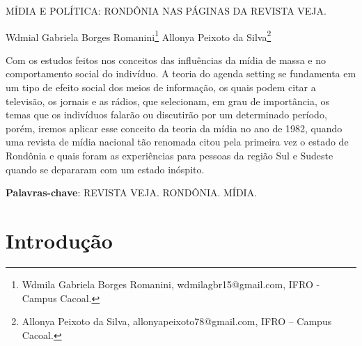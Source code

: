 \documentclass[article,12pt,onesidea,4paper,english,brazil]{abntex2}
\begin{document}
	
	
	\frenchspacing 
	
	\begin{center}
		\LARGE MÍDIA E POLÍTICA: RONDÔNIA NAS PÁGINAS DA REVISTA VEJA.
		
		\normalsize
	Wdmial Gabriela Borges Romanini\footnote{Wdmila Gabriela Borges Romanini, wdmilagbr15@gmail.com, IFRO - Campus Cacoal.} 
	Allonya Peixoto da Silva\footnote{Allonya Peixoto da Silva, allonyapeixoto78@gmail.com, IFRO – Campus Cacoal.} 
		
	\end{center}
	
	\begin{resumoumacoluna}
		Com os estudos feitos nos conceitos das influências da mídia de massa e no comportamento social do indivíduo. A teoria do agenda setting se fundamenta  em um tipo de efeito social dos meios de informação, os quais podem citar a televisão, os jornais e as rádios, que selecionam, em grau de importância, os temas que os indivíduos falarão ou discutirão por um determinado período, porém, iremos aplicar esse conceito da teoria da mídia no ano de 1982, quando uma revista de mídia nacional tão renomada citou pela primeira vez o estado de Rondônia e quais foram as experiências para pessoas da região Sul e Sudeste quando se depararam com um estado inóspito.
		
		\vspace{\onelineskip}
		
		\noindent
		\textbf{Palavras-chave}: REVISTA VEJA. RONDÔNIA. MÍDIA.
	\end{resumoumacoluna}
	
	\section*{Introdução}
	
\end{document}
